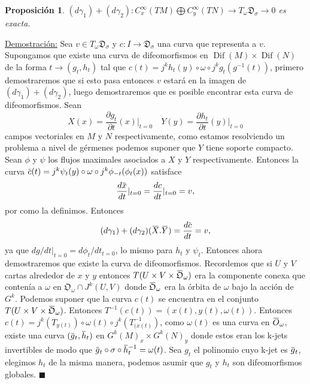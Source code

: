 \documentclass{report}
\newtheorem{prop}[theorem]{Proposici\'on}
\theoremstyle{definition}
\DeclareMathOperator{\dif}{Dif}
\newcommand{\overbar}[1]{\mkern 1.5mu\overline{\mkern-1.5mu#1\mkern-1.5mu}\mkern 1.5mu}
\begin{document}
\begin{prop}
$(d\gamma_1) + (d \gamma_2) : C^\infty_x (TM) \bigoplus C^\infty_y (TN) \to T_\omega \mathfrak{D}_\sigma \to 0$ es exacta.
\end{prop}

\underline{Demostraci\'on:} Sea $v \in T_\omega  \mathfrak{D}_\sigma$ y $c: I \to \mathfrak{D}_\sigma$ una curva que representa a $v$. Supongamos que existe una curva de difeomorfismos en $\dif (M) \times \dif (N)$ de la forma $t \to (g_t , h_t)$ tal que $c(t) = j^k h_t (y) \circ  \omega \circ  j^k g_t (g^{-1} (t))$, primero demostraremos que si esto pasa entonces $v $ estar\'a en la imagen de $(d \gamma_1) + (d \gamma_2)$, luego demostraremos que es posible encontrar esta curva de difeomorfismos. Sean$$
X(x) = \frac{\partial g_t}{\partial t} (x) \vert_{t=0} \quad Y(y) = \frac{\partial h_t}{\partial t} (y) \vert_{t=0}$$
campos vectoriales en $M$ y $N$ respectivamente, como estamos resolviendo un problema a nivel de g\'ermenes podemos suponer que $Y$ tiene soporte compacto. Sean $\phi$ y $\psi$ los flujos maximales asociados a $X$ y $Y$ respectivamente. Entonces la curva $\overbar{c}(t) = j^k \psi_t (y) \circ \omega \circ j^k \phi_{-t} (\phi_t(x))$ satisface
$$\frac{d \overbar{x}}{dt} \vert_{t=0} = \frac{d c}{d t} \vert_{t=0} = v ,$$
por como la definimos. Entonces $$(d \gamma_1) + (d \gamma_2) (\overbar{X} . \overbar{Y}) = \frac{d \overbar{c}}{dt} =v ,$$
ya que $dg / dt \vert_{t=0} = d \phi_t /dt_{t=0}$, lo mismo para $h_t$ y $\psi_t$. Entonces ahora demostraremos que existe la curva de difeomorfismos. Recordemos que si $U$ y $V$ cartas alrededor de $x$ y $y$ entonces $T(U \times V \times \overbar{\mathfrak{O}}_\omega)$ era la componente conexa que conten\'ia a $\omega$ en $\mathfrak{O}_\omega \cap J^k (U,V)$ donde $\overbar{\mathfrak{O}}_\omega$ era la \'orbita de $\omega$ bajo la acci\'on de $G^k$. Podemos suponer que la curva $c(t)$ se encuentra en el conjunto $T(U \times V \times \overbar{\mathfrak{O}}_\omega )$. Entonces   $T^{-1} (c(t)) = (x(t) , y(t), \omega(t))$. Entonces $c(t) = j^k (T_{y(t)}) \circ \omega (t) \circ j^k (T^{-1}_{(x(t)})$, como $\omega (t) $ es una curva en $\overbar{O}_\omega$, existe una curva $(\overbar{g}_t , \overbar{h}_t)$ en $G^k (M)_x \times G^k (N)_y$ donde estos eran los k-jets invertibles de modo que $\overbar{g}_t \circ \sigma \circ \overbar{h}^{-1}_t = \omega (t)$. Sea $g_t$ el polinomio cuyo k-jet es $\overbar{g}_t$, elegimos $h_t$ de la misma manera, podemos asumir que $g_t$ y $h_t$ son difeomorfismos globales. $\blacksquare$
\end{document}
